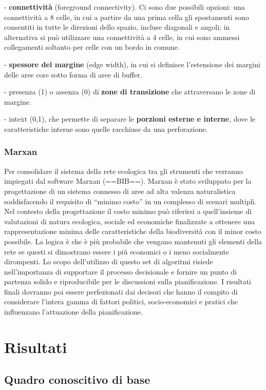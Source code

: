 \documentclass[
]{book}
\begin{document}
- \textbf{connettività} (foreground connectivity).
Ci sono due possibili opzioni: una connettività a 8 celle, in cui a partire da una prima cella gli spostamenti sono consentiti in tutte le direzioni dello spazio, incluse diagonali e angoli; in alternativa si può utilizzare una connettività a 4 celle, in cui sono ammessi collegamenti soltanto per celle con un bordo in comune.

- \textbf{spessore del margine} (edge width), in cui si definisce l'estensione dei margini delle aree core sotto forma di aree di buffer.

- presenza (1) o assenza (0) di \textbf{zone di transizione} che attraversano le zone di margine.

- intext (0,1), che permette di separare le \textbf{porzioni esterne e interne}, dove le caratteristiche interne sono quelle racchiuse da una perforazione.

\subsection{Marxan}\label{marxan}

Per consolidare il sistema della rete ecologica tra gli strumenti che verranno impiegati dal software Marxan (==BIB==).
Marxan è stato sviluppato per la progettazione di un sistema connesso di aree ad alta valenza naturalistica soddisfacendo il requisito di ``minimo costo'' in un complesso di scenari multipli.
Nel contesto della progettazione il costo minimo può riferirsi a quell'insieme di valutazioni di natura ecologica, sociale ed economiche finalizzate a ottenere una rappresentazione minima delle caratteristiche della biodiversità con il minor costo possibile.
La logica è che è più probabile che vengano mantenuti gli elementi della rete se questi si dimostrano essere i più economici o i meno socialmente dirompenti.
Lo scopo dell'utilizzo di questo set di algoritmi risiede nell'importanza di supportare il processo decisionale e fornire un punto di partenza solido e riproducibile per le discussioni sulla pianificazione.
I risultati finali dovranno poi essere perfezionati dai decisori che hanno il compito di considerare l'intera gamma di fattori politici, socio-economici e pratici che influenzano l'attuazione della pianificazione.

\chapter{Risultati}\label{risultati}

\section{Quadro conoscitivo di base}\label{quadro-conoscitivo-di-base}
\end{document}
